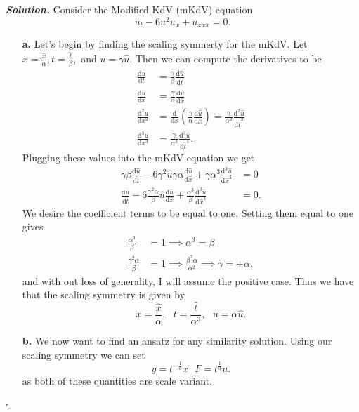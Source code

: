 \documentclass[12pt]{report}
\newenvironment{solution}[1][\it{Solution}]{\textbf{#1. } }{$\square$}
\newcommand{\paren}[1]{{\left(#1\right)}} %
\newcommand{\dd}[2]{\frac{\mathrm{d} #1}{\mathrm{d} #2}} %
\newcommand{\ddn}[3]{\frac{\mathrm{d}^{#1} #2}{\mathrm{d} #3^{#1}}} %
\begin{document}
\begin{solution}
    \noindent
    Consider the Modified KdV (mKdV) equation
    \[
    u_t-6 u^2 u_x+u_{xxx}=0.
    \]
    \begin{enumerate}
        \item[{\bf a.}]
        Let's begin by finding the scaling symmerty for the mKdV. Let $x = \frac{\hat{x}}{\alpha}, t = \frac{\hat{t}}{\beta},$ and $u = \gamma \hat{u}$. Then we can compute the derivatives to be
        \begin{align*}
            \dd{u}{t} &= \frac{\gamma}{\beta}\dd{\hat{u}}{\hat{t}}\\
            \dd{u}{x} &= \frac{\gamma}{\alpha}\dd{\hat{u}}{\hat{x}}\\
            \ddn{2}{u}{x} &= \dd{}{x}\paren{\frac{\gamma}{\alpha}\dd{\hat{u}}{\hat{x}}} = \frac{\gamma}{\alpha^2}\ddn{2}{\hat{u}}{\hat{t}}\\
            \ddn{3}{u}{x} &= \frac{\gamma}{\alpha^3}\ddn{3}{\hat{u}}{\hat{t}}.
        \end{align*}
        Plugging these values into the mKdV equation we get
        \begin{align*}
            \gamma \beta \dd{\hat{u}}{\hat{t}} - 6 \gamma^2 \hat{u}\gamma\alpha \dd{\hat{u}}{\hat{x}} + \gamma \alpha^3 \ddn{3}{\hat{u}}{\hat{x}} &= 0\\
            \dd{\hat{u}}{\hat{t}} - 6 \frac{\gamma^2 \alpha}{\beta} \hat{u}\dd{\hat{u}}{\hat{x}} + \frac{\alpha^3}{\beta} \ddn{3}{\hat{u}}{\hat{x}} &= 0.
        \end{align*}
        We desire the coefficient terms to be equal to one. Setting them equal to one gives
        \begin{align*}
            \frac{\alpha^3}{\beta} &= 1 \implies \alpha^3 = \beta\\
            \frac{\gamma^2\alpha}{\beta} &= 1 \implies \frac{\beta^2 \alpha}{\alpha^2} \implies \gamma = \pm \alpha,
        \end{align*}
        and with out loss of generality, I will assume the positive case. Thus we have that the scaling symmetry is given by
        \[ x = \frac{\hat{x}}{\alpha}, ~~~ t = \frac{\hat{t}}{\alpha^3}, ~~~ u = \alpha \hat{u}.\]

        \item[{\bf b.}]
        We now want to find an ansatz for any similarity solution. Using our scaling symmetry we can set
        \[
            y = t^{-\frac{1}{3}}x ~~~ F = t^\frac{1}{3}u.
        \]
        as both of these quantities are scale variant.
        

\end{enumerate}
\end{solution}
\end{document}
